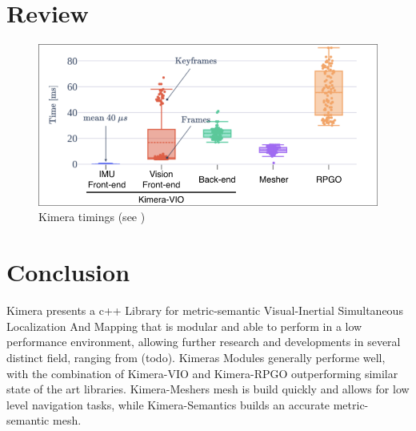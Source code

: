 \documentclass[11pt,a4paper]{article}
\begin{document}
\section{Review}
\begin{figure}
  \centering
  \includegraphics[width=120mm]{Timings}
  \caption{Kimera timings (see \cite{rosinol2020kimera})}\label{Fig:Timings}  
\end{figure}

\section{Conclusion}
Kimera presents a c++ Library for metric-semantic Visual-Inertial Simultaneous Localization And Mapping that is modular and able to perform in a low performance environment, allowing further research and developments in several distinct field, ranging from (todo).
Kimeras Modules generally performe well, with the combination of Kimera-VIO and Kimera-RPGO outperforming similar state of the art libraries.
Kimera-Meshers mesh is build quickly and allows for low level navigation tasks, while Kimera-Semantics builds an accurate metric-semantic mesh.


{\small                   %

}
\end{document}
